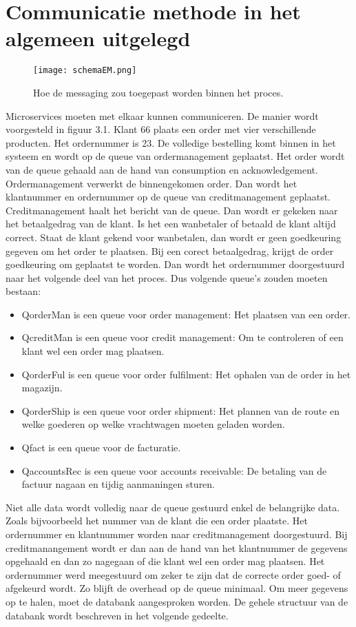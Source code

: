 \section{Communicatie methode in het algemeen uitgelegd}
\begin{figure}[h]
	\texttt{[image: schemaEM.png]}
	\caption{Hoe de messaging zou toegepast worden binnen het proces.}
	\centering
\end{figure}
Microservices moeten met elkaar kunnen communiceren. De manier wordt voorgesteld in figuur 3.1. 
Klant 66 plaats een order met vier verschillende producten. Het ordernummer is 23. De volledige bestelling komt binnen in het systeem en wordt op de queue van ordermanagement geplaatst. Het order wordt van de queue gehaald aan de hand van consumption en acknowledgement. Ordermanagement verwerkt de binnengekomen order. Dan wordt het klantnummer en ordernummer op de queue van creditmanagement geplaatst. Creditmanagement haalt het bericht van de queue. Dan wordt er gekeken naar het betaalgedrag van de klant. Is het een wanbetaler of betaald de klant altijd correct. Staat de klant gekend voor wanbetalen, dan wordt er geen goedkeuring gegeven om het order te plaatsen. Bij een corect betaalgedrag, krijgt de order goedkeuring om geplaatst te worden. Dan wordt het ordernummer doorgestuurd naar het volgende deel van het proces. 
Dus volgende queue's zouden moeten bestaan:
\begin{itemize}
	\item QorderMan is een queue voor order management: Het plaatsen van een order.
	\item QcreditMan is een queue voor credit management: Om te controleren of een klant wel een order mag plaatsen.
	\item QorderFul is een queue voor order fulfilment: Het ophalen van de order in het magazijn.
	\item QorderShip is een queue voor order shipment: Het plannen van de route en welke goederen op welke vrachtwagen moeten geladen worden.
	\item Qfact is een queue voor de facturatie.
	\item QaccountsRec is een queue voor accounts receivable: De betaling van de factuur nagaan en tijdig aanmaningen sturen. 
\end{itemize}

Niet alle data wordt volledig naar de queue gestuurd enkel de belangrijke data. Zoals bijvoorbeeld het nummer van de klant die een order plaatste. Het ordernummer en klantnummer worden naar creditmanagement doorgestuurd. Bij creditmanangement wordt er dan aan de hand van het klantnummer de gegevens opgehaald en dan zo nagegaan of die klant wel een order mag plaatsen. Het ordernummer werd meegestuurd om zeker te zijn dat de correcte order goed- of afgekeurd wordt. Zo blijft de overhead op de queue minimaal. Om meer gegevens op te halen, moet de databank aangesproken worden. De gehele structuur van de databank wordt beschreven in het volgende gedeelte.

